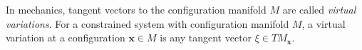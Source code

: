 In mechanics, tangent vectors to the configuration manifold $M$ are called \textit{virtual variations}. For a constrained system with configuration manifold $M$, a virtual variation at a configuration $\mathbf{x} \in M$ is any tangent vector $\xi \in TM_{\mathbf{x}}$.
